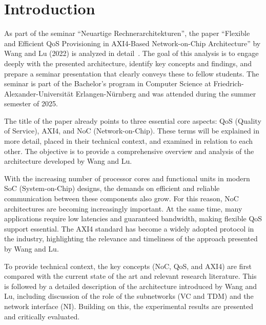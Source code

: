 \chapter{Introduction}

As part of the seminar “Neuartige Rechnerarchitekturen”, the paper “Flexible and Efficient QoS Provisioning in AXI4-Based Network-on-Chip Architecture” by Wang and Lu (2022) is analyzed in detail~\cite{wang_flexible_2022}. The goal of this analysis is to engage deeply with the presented architecture, identify key concepts and findings, and prepare a seminar presentation that clearly conveys these to fellow students.
The seminar is part of the Bachelor's program in Computer Science at Friedrich-Alexander-Universität Erlangen-Nürnberg and was attended during the summer semester of 2025.

The title of the paper already points to three essential core aspects: QoS (Quality of Service), AXI4, and NoC (Network-on-Chip). These terms will be explained in more detail, placed in their technical context, and examined in relation to each other. The objective is to provide a comprehensive overview and analysis of the architecture developed by Wang and Lu.

With the increasing number of processor cores and functional units in modern SoC (System-on-Chip) designs, the demands on efficient and reliable communication between these components also grow. For this reason, NoC architectures are becoming increasingly important. At the same time, many applications require low latencies and guaranteed bandwidth, making flexible QoS support essential. The AXI4 standard has become a widely adopted protocol in the industry, highlighting the relevance and timeliness of the approach presented by Wang and Lu.\cite{jake_ke_demystifying_2025}\cite{gomez-rodriguez_survey_2021}\cite{talwar_traffic_2013}

To provide technical context, the key concepts (NoC, QoS, and AXI4) are first compared with the current state of the art and relevant research literature. This is followed by a detailed description of the architecture introduced by Wang and Lu, including discussion of the role of the subnetworks (VC and TDM) and the network interface (NI). Building on this, the experimental results are presented and critically evaluated.
